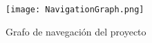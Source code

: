 \begin{figure}[H]
	\centering
	\texttt{[image: NavigationGraph.png]}
	\caption{Grafo de navegación del proyecto}
\end{figure}
